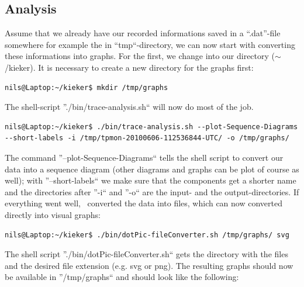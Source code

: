 \documentclass[a4paper, oneside, 11pt]{scrartcl}
\begin{document}
\subsection{Analysis}
Assume that we already have our recorded informations saved in a ``.dat''-file somewhere for example the in ``tmp``-directory, we can now start with converting these informations into graphs. For the first, we change into our \Kieker\-directory ($\sim$/kieker). It is necessary to create a new directory for the graphs first:
\begin{lstlisting}
nils@Laptop:~/kieker$ mkdir /tmp/graphs
\end{lstlisting}
The shell-script ''./bin/trace-analysis.sh`` will now do most of the job.
\begin{lstlisting}
nils@Laptop:~/kieker$ ./bin/trace-analysis.sh --plot-Sequence-Diagrams --short-labels -i /tmp/tpmon-20100606-112536844-UTC/ -o /tmp/graphs/
\end{lstlisting}
The command ''--plot-Sequence-Diagrams`` tells the shell script to convert our data into a sequence diagram (other diagrams and graphs can be plot of course as well); with ''--short-labels`` we make sure that the components get a shorter name and the directories after ''-i`` and ''-o`` are the input- and the output-directories. If everything went well, \Kieker\ converted the data into files, which can now converted directly into visual graphs:
\begin{lstlisting}
nils@Laptop:~/kieker$ ./bin/dotPic-fileConverter.sh /tmp/graphs/ svg
\end{lstlisting}
The shell script ''./bin/dotPic-fileConverter.sh`` gets the directory with the files and the desired file extension (e.g. svg or png). The resulting graphs should now be available in ''/tmp/graphs`` and should look like the following:
\end{document}
